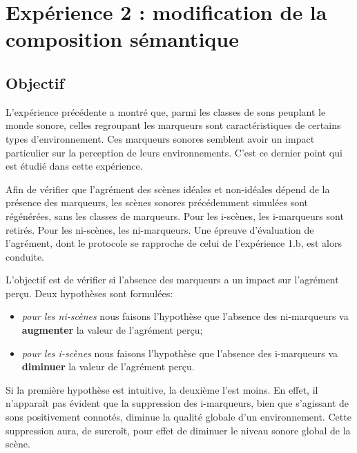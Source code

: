\documentclass[twoside,twocolumn]{article}
\begin{document}

\section{Expérience 2 : modification de la composition sémantique}
\label{sec:xp3}

\subsection{Objectif}

L'expérience précédente a montré que, parmi les classes de sons peuplant le monde sonore, celles regroupant les marqueurs sont caractéristiques de certains types d'environnement. Ces marqueurs sonores semblent avoir un impact particulier sur la perception de leurs environnements. C'est ce dernier point qui est étudié dans cette expérience.

Afin de vérifier que l'agrément des scènes idéales et non-idéales dépend de la présence des marqueurs, les scènes sonores précédemment simulées sont régénérées, sans les classes de marqueurs. Pour les i-scènes, les i-marqueurs sont retirés. Pour les ni-scènes, les ni-marqueurs. Une épreuve d'évaluation de l'agrément, dont le protocole se rapproche de celui de l'expérience 1.b, est alors conduite.

L'objectif est de vérifier si l'absence des marqueurs a un impact sur l'agrément perçu. Deux hypothèses sont formulées:

\begin{itemize}
\item \emph{pour les ni-scènes} nous faisons l'hypothèse que l'absence des ni-marqueurs va \textbf{augmenter} la valeur de l'agrément perçu;
\item \emph{pour les i-scènes} nous faisons l'hypothèse que l'absence des i-marqueurs va \textbf{diminuer} la valeur de l'agrément perçu.
\end{itemize}

Si la première hypothèse est intuitive, la deuxième l'est moins. En effet, il n’apparaît pas évident que la suppression des i-marqueurs, bien que s'agissant de sons positivement connotés, diminue la qualité globale d'un environnement. Cette suppression aura, de surcroît, pour effet de diminuer le niveau sonore global de la scène.
\end{document}
